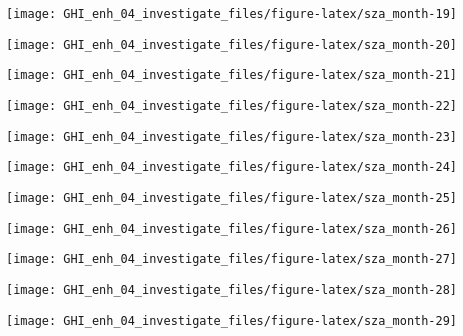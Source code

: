 \documentclass[
  10pt,
  a4paper,oneside]{article}
\begin{document}
\begin{center}\texttt{[image: GHI\_enh\_04\_investigate\_files/figure-latex/sza\_month-19]} \end{center}

\begin{center}\texttt{[image: GHI\_enh\_04\_investigate\_files/figure-latex/sza\_month-20]} \end{center}

\begin{center}\texttt{[image: GHI\_enh\_04\_investigate\_files/figure-latex/sza\_month-21]} \end{center}

\begin{center}\texttt{[image: GHI\_enh\_04\_investigate\_files/figure-latex/sza\_month-22]} \end{center}

\begin{center}\texttt{[image: GHI\_enh\_04\_investigate\_files/figure-latex/sza\_month-23]} \end{center}

\begin{center}\texttt{[image: GHI\_enh\_04\_investigate\_files/figure-latex/sza\_month-24]} \end{center}

\begin{center}\texttt{[image: GHI\_enh\_04\_investigate\_files/figure-latex/sza\_month-25]} \end{center}

\begin{center}\texttt{[image: GHI\_enh\_04\_investigate\_files/figure-latex/sza\_month-26]} \end{center}

\begin{center}\texttt{[image: GHI\_enh\_04\_investigate\_files/figure-latex/sza\_month-27]} \end{center}

\begin{center}\texttt{[image: GHI\_enh\_04\_investigate\_files/figure-latex/sza\_month-28]} \end{center}

\begin{center}\texttt{[image: GHI\_enh\_04\_investigate\_files/figure-latex/sza\_month-29]} \end{center}
\end{document}
